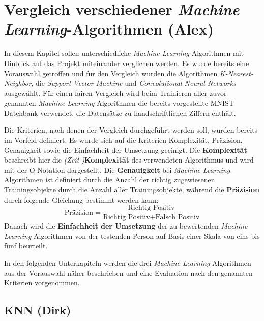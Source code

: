 \section{Vergleich verschiedener \textit{Machine Learning}-Algorithmen (Alex)}
In diesem Kapitel sollen unterschiedliche \textit{Machine Learning}-Algorithmen mit Hinblick auf das Projekt miteinander verglichen werden.
Es wurde bereits eine Vorauswahl getroffen und für den Vergleich wurden die Algorithmen \textit{K-Nearest-Neighbor}, die \textit{Support Vector Machine} und
\textit{Convolutional Neural Networks} ausgewählt. Für einen fairen Vergleich wird beim Trainieren aller zuvor genannten \textit{Machine Learning}-Algorithmen
die bereits vorgestellte MNIST-Datenbank verwendet, die Datensätze zu handschriftlichen Ziffern enthält.

Die Kriterien, nach denen der Vergleich durchgeführt werden soll, wurden bereits im Vorfeld definiert. Es wurde sich auf die Kriterien Komplexität,
Präzision, Genauigkeit sowie die Einfachheit der Umsetzung geeinigt. Die \textbf{Komplexität} beschreibt hier die \textit{(Zeit-)}\textbf{Komplexität} des verwendeten Algorithmus und wird mit der O-Notation dargestellt.
Die \textbf{Genauigkeit} bei \textit{Machine Learning}-Algorithmen ist definiert durch die Anzahl der richtig zugewiesenen Trainingsobjekte durch die Anzahl aller
Trainingsobjekte, während die \textbf{Präzision} durch folgende Gleichung bestimmt werden kann:
\[ \text{Präzision} = \frac{\text{Richtig Positiv}}{\text{Richtig Positiv} + \text{Falsch Positiv}} \]
Danach wird die \textbf{Einfachheit der Umsetzung} der zu bewertenden \textit{Machine Learning}-Algorithmen von der testenden Person auf Basis einer Skala von
eins bis fünf beurteilt.

In den folgenden Unterkapiteln werden die drei \textit{Machine Learning}-Algorithmen aus der Vorauswahl näher beschrieben und eine Evaluation nach den genannten 
Kriterien vorgenommen.

\subsection{KNN (Dirk)}

